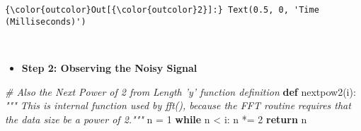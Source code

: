\documentclass[11pt]{article}
\providecommand{\tightlist}{%
      \setlength{\itemsep}{0pt}\setlength{\parskip}{0pt}}
\newenvironment{Shaded}{}{}
\newcommand{\KeywordTok}[1]{\textcolor[rgb]{0.00,0.44,0.13}{\textbf{{#1}}}}
\newcommand{\DecValTok}[1]{\textcolor[rgb]{0.25,0.63,0.44}{{#1}}}
\newcommand{\CommentTok}[1]{\textcolor[rgb]{0.38,0.63,0.69}{\textit{{#1}}}}
\newcommand{\NormalTok}[1]{{#1}}
\newcommand{\ControlFlowTok}[1]{\textcolor[rgb]{0.00,0.44,0.13}{\textbf{{#1}}}}
\newcommand{\OperatorTok}[1]{\textcolor[rgb]{0.40,0.40,0.40}{{#1}}}
\begin{document}
\begin{Verbatim}[commandchars=\\\{\}]
{\color{outcolor}Out[{\color{outcolor}2}]:} Text(0.5, 0, 'Time (Milliseconds)')
\end{Verbatim}
            
    \begin{center}
    \end{center}
    { \hspace*{\fill} \\}
    
    \begin{itemize}
\tightlist
\item
  \textbf{Step 2: Observing the Noisy Signal}
\end{itemize}

\begin{Shaded}
\begin{Highlighting}[]
\CommentTok{# Also the Next Power of 2 from Length 'y' function definition}
\KeywordTok{def}\NormalTok{ nextpow2(i):}
    \CommentTok{""" This is internal function used by fft(), because the FFT routine}
\CommentTok{   requires that the data size be a power of 2."""}
\NormalTok{    n }\OperatorTok{=} \DecValTok{1}
    \ControlFlowTok{while}\NormalTok{ n }\OperatorTok{<}\NormalTok{ i: }
\NormalTok{        n }\OperatorTok{*=} \DecValTok{2}
    \ControlFlowTok{return}\NormalTok{ n}
\end{Highlighting}
\end{Shaded}
\end{document}
